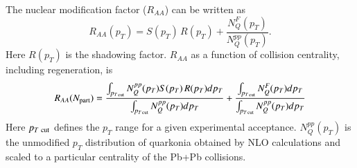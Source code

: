 \documentclass[review]{elsarticle}
\begin{document}
{\begin{equation}
  \end{equation}
  The nuclear modification factor ($R_{AA}$) can be written as 
  \begin{equation}
    R_{AA}(p_T)=S(p_T) \, R(p_T) + \frac{N_{Q}^F(p_T)}{N_{Q}^{pp}(p_T)}.
    \label{raa}
  \end{equation}
  Here $R(p_T)$ is the shadowing factor.
  $R_{AA}$ as a function of collision centrality, including regeneration, is
  \begin{equation}
    R_{AA}(N_{\rm part}) = \frac{\int_{p_{T\,\rm cut}} N_{Q}^{pp}(p_T)S(p_T)\, R(p_T) dp_T}{\int_{p_{T\,\rm cut}} N_{Q}^{pp}(p_T) dp_T} + 
    \frac{\int_{p_{T\, \rm cut}} N_{Q}^F(p_T) dp_T}{\int_{p_{T\, \rm cut}} N_{Q}^{pp}(p_T) dp_T}
    \label{raa2}
  \end{equation}
  Here $p_{T~{\rm cut}}$ defines the $p_T$ range for a given experimental acceptance.
  $N_{Q}^{pp}(p_T)$ is the unmodified $p_T$ distribution of quarkonia obtained by NLO 
  calculations and scaled to a particular centrality of the Pb+Pb collisions.
  
}
\end{document}
